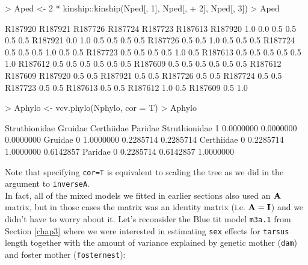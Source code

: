\documentclass{article}
\begin{document}
\begin{Schunk}
\begin{Sinput}
> Aped <- 2 * kinship::kinship(Nped[, 1], Nped[, 
+     2], Nped[, 3])
> Aped
\end{Sinput}
\begin{Soutput}
        R187920 R187921 R187726 R187724 R187723 R187613
R187920     1.0     0.0     0.5     0.5     0.5     0.5
R187921     0.0     1.0     0.5     0.5     0.5     0.5
R187726     0.5     0.5     1.0     0.5     0.5     0.5
R187724     0.5     0.5     0.5     1.0     0.5     0.5
R187723     0.5     0.5     0.5     0.5     1.0     0.5
R187613     0.5     0.5     0.5     0.5     0.5     1.0
R187612     0.5     0.5     0.5     0.5     0.5     0.5
R187609     0.5     0.5     0.5     0.5     0.5     0.5
        R187612 R187609
R187920     0.5     0.5
R187921     0.5     0.5
R187726     0.5     0.5
R187724     0.5     0.5
R187723     0.5     0.5
R187613     0.5     0.5
R187612     1.0     0.5
R187609     0.5     1.0
\end{Soutput}
\end{Schunk}

\begin{Schunk}
\begin{Sinput}
> Aphylo <- vcv.phylo(Nphylo, cor = T)
> Aphylo
\end{Sinput}
\begin{Soutput}
              Struthionidae   Gruidae Certhiidae   Paridae
Struthionidae             1 0.0000000  0.0000000 0.0000000
Gruidae                   0 1.0000000  0.2285714 0.2285714
Certhiidae                0 0.2285714  1.0000000 0.6142857
Paridae                   0 0.2285714  0.6142857 1.0000000
\end{Soutput}
\end{Schunk}

Note that specifying \texttt{cor=T} is equivalent to scaling the tree as we did in the argument to \texttt{inverseA}.\\

In fact, all of the mixed models we fitted in earlier sections also used an ${\bf A}$ matrix, but in those cases the matrix was an identity matrix (i.e. ${\bf A}={\bf I}$) and we didn't have to worry about it. Let's reconsider the Blue tit model \texttt{m3a.1} from Section \ref{chap3} where we were interested in estimating \texttt{sex} effects for \texttt{tarsus} length together with the amount of variance explained by genetic mother (\texttt{dam}) and  foster mother  (\texttt{fosternest}):
\end{document}
